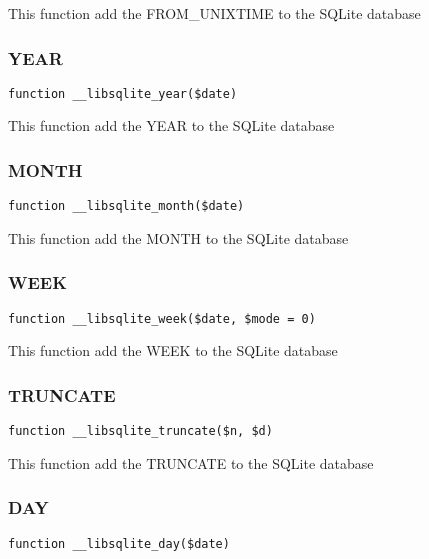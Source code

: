 \documentclass[a4paper]{article}
\begin{document}
This function add the FROM\_UNIXTIME to the SQLite database

\hypertarget{toc301}{}
\subsubsection{YEAR}

\begin{lstlisting}
function __libsqlite_year($date)
\end{lstlisting}

This function add the YEAR to the SQLite database

\hypertarget{toc302}{}
\subsubsection{MONTH}

\begin{lstlisting}
function __libsqlite_month($date)
\end{lstlisting}

This function add the MONTH to the SQLite database

\hypertarget{toc303}{}
\subsubsection{WEEK}

\begin{lstlisting}
function __libsqlite_week($date, $mode = 0)
\end{lstlisting}

This function add the WEEK to the SQLite database

\hypertarget{toc304}{}
\subsubsection{TRUNCATE}

\begin{lstlisting}
function __libsqlite_truncate($n, $d)
\end{lstlisting}

This function add the TRUNCATE to the SQLite database

\hypertarget{toc305}{}
\subsubsection{DAY}

\begin{lstlisting}
function __libsqlite_day($date)
\end{lstlisting}
\end{document}
